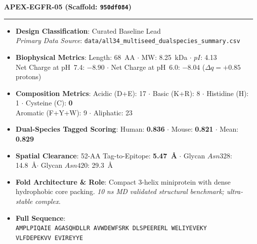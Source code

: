 \documentclass[11pt]{article}
\begin{document}
\noindent\textbf{\color{navyblue}\large APEX-EGFR-05  \quad (Scaffold: \texttt{950df084})} \\
\vspace{-0.4em}
\rule{\textwidth}{0.6pt}
\vspace{-0.2em}
\begin{itemize}
  \setlength{\itemsep}{2pt}
  \setlength{\parskip}{0pt}
  \item \textbf{Design Classification}: Curated Baseline Lead \\
    \textit{Primary Data Source}: \texttt{\small data/all34\_multiseed\_dualspecies\_summary.csv}
  \item \textbf{Biophysical Metrics}: Length: 68~AA $\cdot$ MW: 8.25~kDa $\cdot$ $pI$: 4.13 \\
    Net Charge at pH~7.4: $-8.90$ $\cdot$ Net Charge at pH~6.0: $-8.04$ ($\Delta q = +0.85$ protons)
  \item \textbf{Composition Metrics}: Acidic (D+E): 17 $\cdot$ Basic (K+R): 8 $\cdot$ Histidine (H): 1 $\cdot$ Cysteine (C): \textbf{0} \\
    Aromatic (F+Y+W): 9 $\cdot$ Aliphatic: 23
  \item \textbf{Dual-Species Tagged Scoring}: Human: \textbf{0.836} $\cdot$ Mouse: \textbf{0.821} $\cdot$ Mean: \textbf{0.829}
  \item \textbf{Spatial Clearance}: 52-AA Tag-to-Epitope: \textbf{5.47~\AA} $\cdot$ Glycan $Asn328$: 14.8~\AA $\cdot$ Glycan $Asn420$: 29.3~\AA
  \item \textbf{Fold Architecture \& Role}: Compact 3-helix miniprotein with dense hydrophobic core packing. \textit{10 ns MD validated structural benchmark; ultra-stable complex}.
  \item \textbf{Full Sequence}: \\
    \texttt{\small AMPLPIQAIE AGASQHDLLR AVWDEWFSRK DLSPEERERL WELIYEVEKY \\
    VLFDEPEKVV EVIREYYE}
\end{itemize}
\vspace{0.8em}
\end{document}
